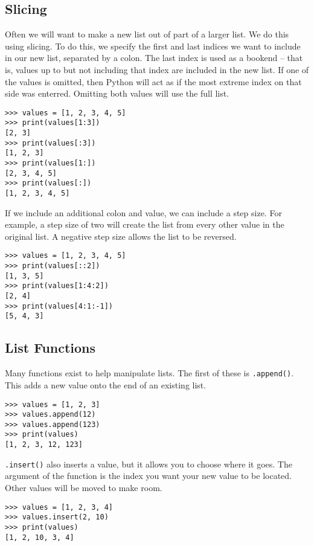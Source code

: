 \documentclass[11pt]{cselabheader}
\begin{document}
\subsection{Slicing}
Often we will want to make a new list out of part of a larger list. We do this using slicing. To do this, we specify the first and last indices we want to include in our new list, separated by a colon. The last index is used as a bookend -- that is, values up to but not including that index are included in the new list. If one of the values is omitted, then Python will act as if the most extreme index on that side was enterred. Omitting both values will use the full list.

\begin{lstlisting}[style=ipython]
>>> values = [1, 2, 3, 4, 5]
>>> print(values[1:3])
[2, 3]
>>> print(values[:3])
[1, 2, 3]
>>> print(values[1:])
[2, 3, 4, 5]
>>> print(values[:])
[1, 2, 3, 4, 5]
\end{lstlisting}

If we include an additional colon and value, we can include a step size. For example, a step size of two will create the list from every other value in the original list. A negative step size allows the list to be reversed.

\begin{lstlisting}[style=ipython]
>>> values = [1, 2, 3, 4, 5]
>>> print(values[::2])
[1, 3, 5]
>>> print(values[1:4:2])
[2, 4]
>>> print(values[4:1:-1])
[5, 4, 3]
\end{lstlisting}

\subsection{List Functions}
Many functions exist to help manipulate lists. The first of these is \lstinline{.append()}. This adds a new value onto the end of an existing list.

\begin{lstlisting}[style=ipython]
>>> values = [1, 2, 3]
>>> values.append(12)
>>> values.append(123)
>>> print(values)
[1, 2, 3, 12, 123]
\end{lstlisting}

\lstinline{.insert()} also inserts a value, but it allows you to choose where it goes. The argument of the function is the index you want your new value to be located. Other values will be moved to make room.

\begin{lstlisting}[style=ipython]
>>> values = [1, 2, 3, 4]
>>> values.insert(2, 10)
>>> print(values)
[1, 2, 10, 3, 4]
\end{lstlisting}
\end{document}
